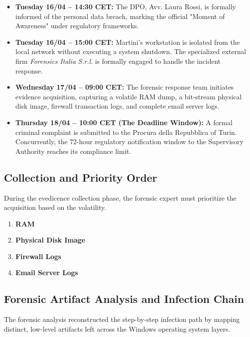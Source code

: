 \begin{itemize}
    \item \textbf{Tuesday 16/04 -- 14:30 CET:} The DPO, Avv. Laura Rossi, is formally informed of the personal data breach, marking the official "Moment of Awareness" under regulatory frameworks.
    \item \textbf{Tuesday 16/04 -- 15:00 CET:} Martini's workstation is isolated from the local network without executing a system shutdown. The specialized external firm \textit{Forensics Italia S.r.l.} is formally engaged to handle the incident response.
    \item \textbf{Wednesday 17/04 -- 09:00 CET:} The forensic response team initiates evidence acquisition, capturing a volatile RAM dump, a bit-stream physical disk image, firewall transaction logs, and complete email server logs.
    \item \textbf{Thursday 18/04 -- 10:00 CET (The Deadline Window):} A formal criminal complaint is submitted to the Procura della Repubblica of Turin. Concurrently, the 72-hour regulatory notification window to the Supervisory Authority reaches its compliance limit.
\end{itemize}



\subsection{Collection and Priority Order}
During the evedicence collection phase, the forensic expert must prioritize the acquisition based on the volatility.
\begin{enumerate}
    \item \textbf{RAM} 
    \item \textbf{Physical Disk Image} 
    \item \textbf{Firewall Logs} 
    \item \textbf{Email Server Logs} 
\end{enumerate}



\subsection{Forensic Artifact Analysis and Infection Chain}
The forensic analysis reconstructed the step-by-step infection path by mapping distinct, low-level artifacts left across the Windows operating system layers.


